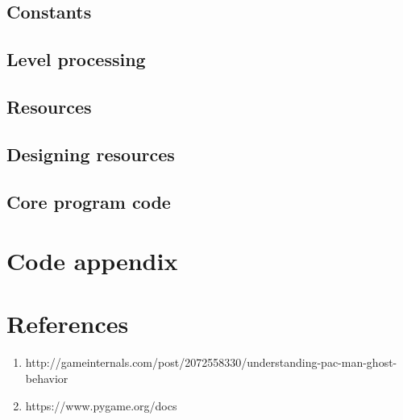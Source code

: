 \documentclass[11pt,a4paper]{report}
\begin{document}
		\section{Constants}
		\section{Level processing}
		\section{Resources}
		\section{Designing resources}
		\section{Core program code}
	\chapter{Code appendix}
	\chapter{References}
		\begin{enumerate}
			\item
				http://gameinternals.com/post/2072558330/understanding-pac-man-ghost-behavior
				\label{stronaopacmanie}
			\item
				https://www.pygame.org/docs
				\label{pygamedocs}
		\end{enumerate}
			
\end{document}
